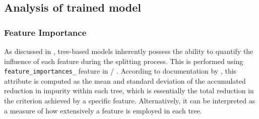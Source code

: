 

\pagebreak

\subsection{Analysis of trained model}\label{sec:BBM_model_eval}

\subsubsection{Feature Importance}\label{sec:feature_importance_bbm}

As discussed in , tree-based models inherently possess the ability to quantify the influence of each feature during the splitting process. This is performed using {\tt feature\_importances\_} feature in \scikit/ . According to documentation by , this attribute is computed as the mean and standard deviation of the accumulated reduction in impurity within each tree, which is essentially the total reduction in the criterion achieved by a specific feature. Alternatively, it can be interpreted as a measure of how extensively a feature is employed in each tree.\\

